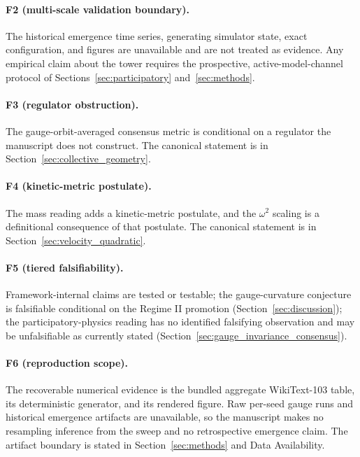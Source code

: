 \documentclass[11pt]{article}
\begin{document}
\paragraph{F2 (multi-scale validation boundary).} The historical emergence time series, generating simulator state, exact configuration, and figures are unavailable and are not treated as evidence. Any empirical claim about the tower requires the prospective, active-model-channel protocol of Sections~\ref{sec:participatory} and~\ref{sec:methods}.

\paragraph{F3 (regulator obstruction).} The gauge-orbit-averaged consensus metric is conditional on a regulator the manuscript does not construct. The canonical statement is in Section~\ref{sec:collective_geometry}.

\paragraph{F4 (kinetic-metric postulate).} The mass reading adds a kinetic-metric postulate, and the $\omega^2$ scaling is a definitional consequence of that postulate. The canonical statement is in Section~\ref{sec:velocity_quadratic}.

\paragraph{F5 (tiered falsifiability).} Framework-internal claims are tested or testable; the gauge-curvature conjecture is falsifiable conditional on the Regime II promotion (Section~\ref{sec:discussion}); the participatory-physics reading has no identified falsifying observation and may be unfalsifiable as currently stated (Section~\ref{sec:gauge_invariance_consensus}).

\paragraph{F6 (reproduction scope).} The recoverable numerical evidence is the bundled aggregate WikiText-103 table, its deterministic generator, and its rendered figure. Raw per-seed gauge runs and historical emergence artifacts are unavailable, so the manuscript makes no resampling inference from the sweep and no retrospective emergence claim. The artifact boundary is stated in Section~\ref{sec:methods} and Data Availability.
\end{document}
